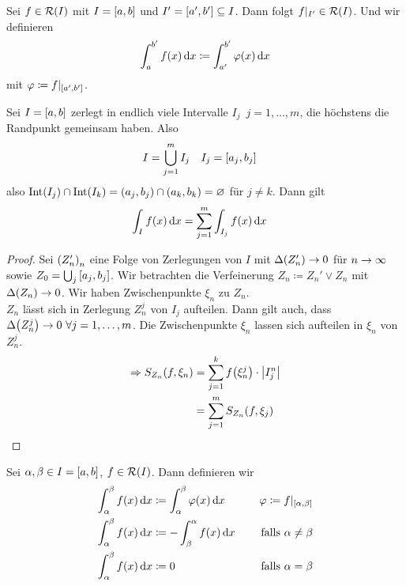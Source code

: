 \begin{bemerkung}
    Sei $f\in\mR\of{I}$ mit $I=\left[a,b\right]$ und $I'=\left[a', b'\right]\subseteq I$. Dann folgt $f\vert_{I'}\in\mR\of{I}$. Und wir definieren
    \begin{align*}
        \int_{a}^{b'} f\of{x} \dif x \coloneqq \int_{a'}^{b'} \varphi\of{x} \dif x
    \end{align*}
    mit $\varphi\coloneqq f\vert_{\left[a', b'\right]}$.
\end{bemerkung}

\begin{satz} %
    \label{satz:temp-2.2}
    Sei $I=\left[a, b\right]$ zerlegt in endlich viele Intervalle $I_j$~$j=1,\dots, m$, die höchstens die Randpunkt gemeinsam haben. Also
    \begin{align*}
        I &= \bigcup_{j=1}^{m} I_j\quad I_j = \left[a_j, b_j\right]
    \end{align*}
    also $\text{Int}\of{I_j} \cap \text{Int}\of{I_k} = \pair{a_j, b_j}\cap\pair{a_k, b_k} = \emptyset$ für $j\neq k$. Dann gilt
    \begin{align*}
        \int_{I}^{} f\of{x} \dif x &= \sum_{j=1}^{m} \int_{I_j}^{} f\of{x} \dif x
    \end{align*}
    \begin{proof}
        Sei $\left(Z'_n\right)_n$ eine Folge von Zerlegungen von $I$ mit $\Delta\of{Z'_n}\fromto 0$ für $n\rightarrow{}\infty$ sowie $Z_0 = \bigcup_j \left[a_j, b_j\right]$. Wir betrachten die Verfeinerung $Z_n\coloneqq Z_n' \lor Z_n$ mit $\Delta\of{Z_n}\fromto 0$. Wir haben Zwischenpunkte $\xi_n$ zu $Z_n$.\\
        $Z_n$ lässt sich in Zerlegung $Z_n^j$ von $I_j$ aufteilen. Dann gilt auch, dass $\Delta\of{Z_n^j}\fromto 0~\forall j=1, \dots, m$. Die Zwischenpunkte $\xi_n$ lassen sich aufteilen in $\xi_n$ von $Z_n^j$.
        \begin{align*}
            \impl S_{Z_n}\of{f, \xi_n} &= \sum_{j=1}^{k} f\of{\xi_n^j}\cdot\abs{I_j^n}\\
            &= \sum_{j=1}^{m} S_{Z_n}\of{f, \xi_j}\qedhere
        \end{align*}
    \end{proof}
\end{satz}

\begin{definition}
    Sei $\alpha, \beta\in I = \left[a,b\right]$, $f\in\mR\of{I}$. Dann definieren wir
    \begin{alignat*}{2}
        \int_{\alpha}^{\beta} f\of{x} \dif x&\coloneqq \int_{\alpha}^{\beta} \varphi\of{x}\dif x  &\quad \varphi \coloneqq f\vert_{\interv{\alpha, \beta}} \\
        \int_{\alpha}^{\beta} f\of{x} \dif x&\coloneqq -\int_{\beta}^{\alpha} f\of{x} \dif x &\quad\text{ falls } \alpha \neq \beta\\
        \int_{\alpha}^{\beta} f\of{x} \dif x&\coloneqq 0 &\quad\text{ falls } \alpha = \beta\\
    \end{alignat*}
\end{definition}

